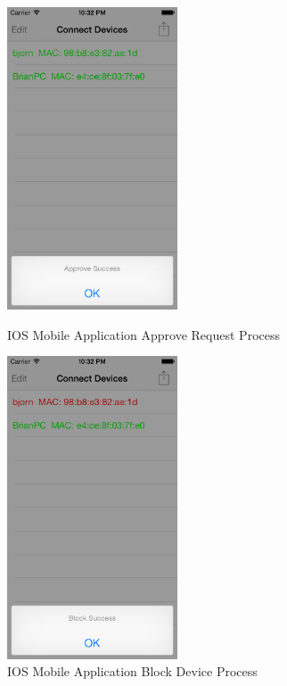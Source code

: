 \begin{figure}
	\centering
	\begin{minipage}{0.45\textwidth}
		\centering
    		\includegraphics[width=0.45\textwidth,natwidth=610,natheight=642]{figs/ios_app_approve_request.png}
  		\caption{IOS Mobile Application Approve Request Process}
  		\label{fig:ios_approve}
  	\end{minipage}
  	\hfill
  	\begin{minipage}{0.45\textwidth}
  		\centering
		\includegraphics[width=0.45\textwidth,natwidth=610,natheight=642]{figs/ios_app_block_request.png}
  		\caption{IOS Mobile Application Block Device Process}
  		\label{fig:ios_block}
  	\end{minipage}
\end{figure}

